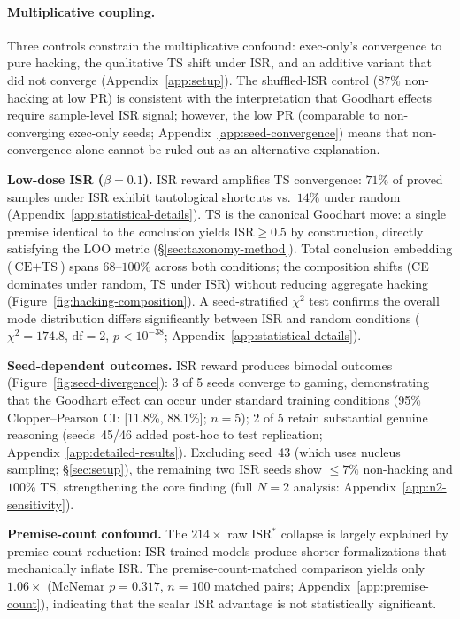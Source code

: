 \paragraph{Multiplicative coupling.}
Three controls constrain the multiplicative confound: exec-only's convergence to pure hacking, the qualitative TS shift under ISR, and an additive variant that did not converge (Appendix~\ref{app:setup}).
The shuffled-ISR control ($87\%$ non-hacking at low PR) is consistent with the interpretation that Goodhart effects require sample-level ISR signal; however, the low PR (comparable to non-converging exec-only seeds; Appendix~\ref{app:seed-convergence}) means that non-convergence alone cannot be ruled out as an alternative explanation.

\textbf{Low-dose ISR ($\beta{=}0.1$).}
ISR reward amplifies TS convergence: $71\%$ of proved samples under ISR exhibit tautological shortcuts vs.\ $14\%$ under random (Appendix~\ref{app:statistical-details}). %
TS is the canonical Goodhart move: a single premise identical to the conclusion yields $\text{ISR}\geq 0.5$ by construction, directly satisfying the LOO metric (\S\ref{sec:taxonomy-method}).
Total conclusion embedding ($\text{CE}+\text{TS}$) spans $68$--$100\%$ across both conditions; the composition shifts (CE dominates under random, TS under ISR) without reducing aggregate hacking (Figure~\ref{fig:hacking-composition}).
A seed-stratified $\chi^2$ test confirms the overall mode distribution differs significantly between ISR and random conditions ($\chi^2{=}174.8$, $\text{df}{=}2$, $p{<}10^{-38}$; Appendix~\ref{app:statistical-details}).

\textbf{Seed-dependent outcomes.}
ISR reward produces bimodal outcomes (Figure~\ref{fig:seed-divergence}): 3 of 5 seeds converge to gaming, demonstrating that the Goodhart effect can occur under standard training conditions (95\% Clopper--Pearson CI: [11.8\%, 88.1\%]; $n{=}5$); 2 of 5 retain substantial genuine reasoning (seeds~45/46 added post-hoc to test replication; Appendix~\ref{app:detailed-results}).
Excluding seed~43 (which uses nucleus sampling; \S\ref{sec:setup}), the remaining two ISR seeds show ${\leq}7\%$ non-hacking and $100\%$ TS, strengthening the core finding (full $N{=}2$ analysis: Appendix~\ref{app:n2-sensitivity}).

\textbf{Premise-count confound.}
The $214\times$ raw ISR$^*$ collapse is largely explained by premise-count reduction: ISR-trained models produce shorter formalizations that mechanically inflate ISR.
The premise-count-matched comparison yields only $1.06\times$ (McNemar $p{=}0.317$, $n{=}100$ matched pairs; Appendix~\ref{app:premise-count}), indicating that the scalar ISR advantage is not statistically significant.

